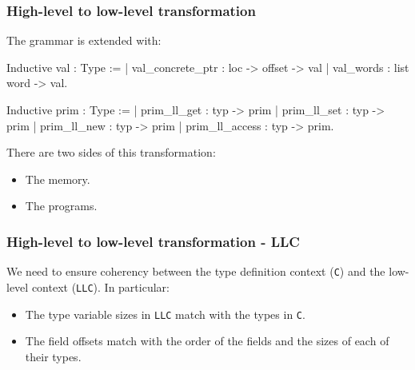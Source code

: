 \begin{frame}[fragile]
\frametitle{High-level to low-level transformation}

The grammar is extended with:

\begin{coqs}
  Inductive val : Type :=
    | val_concrete_ptr : loc -> offset -> val
    | val_words : list word -> val.
  
  Inductive prim : Type :=
    | prim_ll_get : typ -> prim
    | prim_ll_set : typ -> prim
    | prim_ll_new : typ -> prim
    | prim_ll_access : typ -> prim.
\end{coqs}

\bigskip \pause

There are two sides of this transformation:
\begin{itemize}
	\item The memory.
	\item The programs.
\end{itemize}

\end{frame}


\begin{frame}[fragile]
\frametitle{High-level to low-level transformation - LLC}

We need to ensure coherency between the type definition context (\texttt{C}) and the low-level context (\texttt{LLC}). In particular:

\begin{itemize}
	\item The type variable sizes in \texttt{LLC} match with the types in \texttt{C}.
	\item The field offsets match with the order of the fields and the sizes of each of their types.
\end{itemize}

\end{frame}


